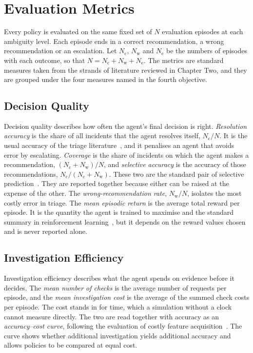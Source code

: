 \documentclass[12pt,a4paper]{article}
\begin{document}
\section{Evaluation Metrics}
\label{sec:metrics}

Every policy is evaluated on the same fixed set of $N$ evaluation episodes at each ambiguity level. Each episode ends in a correct recommendation, a wrong recommendation or an escalation. Let $N_{\text{c}}$, $N_{\text{w}}$ and $N_{\text{e}}$ be the numbers of episodes with each outcome, so that $N = N_{\text{c}} + N_{\text{w}} + N_{\text{e}}$. The metrics are standard measures taken from the strands of literature reviewed in Chapter Two, and they are grouped under the four measures named in the fourth objective.

\subsection{Decision Quality}

Decision quality describes how often the agent's final decision is right. \emph{Resolution accuracy} is the share of all incidents that the agent resolves itself, $N_{\text{c}} / N$. It is the usual accuracy of the triage literature~\cite{remil2024}, and it penalises an agent that avoids error by escalating. \emph{Coverage} is the share of incidents on which the agent makes a recommendation, $(N_{\text{c}} + N_{\text{w}}) / N$, and \emph{selective accuracy} is the accuracy of those recommendations, $N_{\text{c}} / (N_{\text{c}} + N_{\text{w}})$. These two are the standard pair of selective prediction~\cite{geifman2019}. They are reported together because either can be raised at the expense of the other. The \emph{wrong-recommendation rate}, $N_{\text{w}} / N$, isolates the most costly error in triage. The \emph{mean episodic return} is the average total reward per episode. It is the quantity the agent is trained to maximise and the standard summary in reinforcement learning~\cite{sutton2018}, but it depends on the reward values chosen and is never reported alone.

\subsection{Investigation Efficiency}

Investigation efficiency describes what the agent spends on evidence before it decides. The \emph{mean number of checks} is the average number of requests per episode, and the \emph{mean investigation cost} is the average of the summed check costs per episode. The cost stands in for time, which a simulation without a clock cannot measure directly. The two are read together with accuracy as an \emph{accuracy--cost curve}, following the evaluation of costly feature acquisition~\cite{janisch2019}. The curve shows whether additional investigation yields additional accuracy and allows policies to be compared at equal cost.
\end{document}
